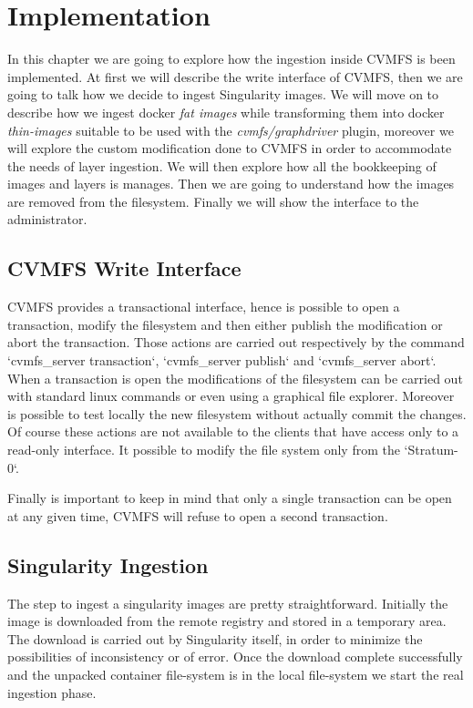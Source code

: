\chapter{Implementation}\label{ch:Implementation}

In this chapter we are going to explore how the ingestion inside CVMFS is been
implemented. At first we will describe the write interface of CVMFS, then we
are going to talk how we decide to ingest Singularity images. We will move on
to describe how we ingest docker \textit{fat images} while transforming them
into docker \textit{thin-images} suitable to be used with the
\textit{cvmfs/graphdriver} plugin, moreover we will explore the custom
modification done to CVMFS in order to accommodate the needs of layer
ingestion. We will then explore how all the bookkeeping of images and layers is
manages.  Then we are going to understand how the images are removed from the
filesystem. Finally we will show the interface to the administrator.

\section{CVMFS Write Interface}

CVMFS provides a transactional interface, hence is possible to open a
transaction, modify the filesystem and then either publish the modification or
abort the transaction. Those actions are carried out respectively by the
command `cvmfs\_server transaction`, `cvmfs\_server publish` and `cvmfs\_server
abort`. When a transaction is open the modifications of the filesystem can be
carried out with standard linux commands or even using a graphical file
explorer.  Moreover is possible to test locally the new filesystem without
actually commit the changes. Of course these actions are not available to the
clients that have access only to a read-only interface. It possible to modify
the file system only from the `Stratum-0`. 

Finally is important to keep in mind that only a single transaction can be open
at any given time, CVMFS will refuse to open a second transaction. 

\section{Singularity Ingestion}

The step to ingest a singularity images are pretty straightforward. Initially
the image is downloaded from the remote registry and stored in a temporary
area. The download is carried out by Singularity itself, in order to minimize
the possibilities of inconsistency or of error. Once the download complete
successfully and the unpacked container file-system is in the local file-system
we start the real ingestion phase.

